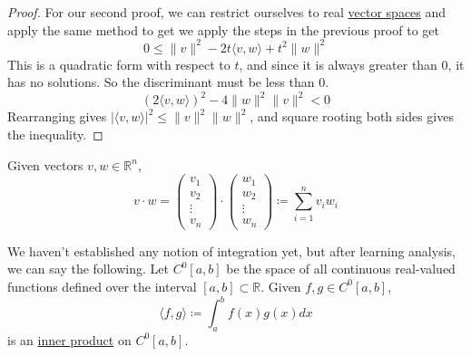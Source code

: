 	\begin{proof}
		For our second proof, we can restrict ourselves to real \hyperref[def:vector-space]{vector spaces} and apply the same method to get 
		we apply the steps in the previous proof to get  
		\begin{equation}
		  0 \leq \|v\|^2 - 2 t \langle v, w \rangle + t^2 \|w\|^2
		\end{equation} 
		This is a quadratic form with respect to $t$, and since it is always greater than $0$, it has no solutions. So the discriminant must be less than $0$. 
		\begin{equation}
			(2 \langle v, w \rangle)^2 - 4 \|w\|^2 \|v\|^2 < 0
		\end{equation}
		Rearranging gives $|\langle v, w \rangle|^2 \leq \|v\|^2 \|w\|^2$, and square rooting both sides gives the inequality. 
	\end{proof}

  \begin{example}
    \label{ex:dot-product}
    Given vectors $v, w \in \mathbb{R}^n$, 
    \begin{equation}
      v \cdot w = \begin{pmatrix} v_1 \\ v_2 \\ \vdots \\ v_n \end{pmatrix} \cdot \begin{pmatrix} w_1 \\ w_2 \\ \vdots \\ w_n \end{pmatrix} \coloneqq \sum_{i=1}^n v_i w_i
    \end{equation}
  \end{example}

  \begin{example}
    \label{ex:integral-product}
    We haven't established any notion of integration yet, but after learning analysis, we can say the following. Let $C^0[a, b]$ be the space of all continuous real-valued functions defined over the interval $[a,b] \subset \mathbb{R}$. Given $f, g \in C^0[a,b]$, 
    \begin{equation}
      \langle f, g \rangle \coloneqq \int_a^b f(x)g(x) d x
    \end{equation}
    is an \hyperref[def:inner-product]{inner product} on $C^0[a, b]$. 
  \end{example}

